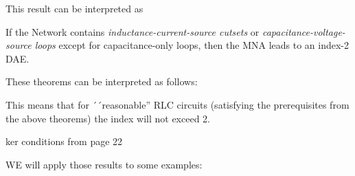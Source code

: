 This result can be interpreted as 

\begin{theorem} \cite{Tischendorf2004Topological}
	If the Network contains \emph{inductance-current-source cutsets} or \emph{capacitance-voltage-source loops} except for capacitance-only loops, then the MNA leads to an index-2 DAE.
\end{theorem}

These theorems can be interpreted as follows:


This means that for ´´reasonable'' RLC circuits (satisfying the prerequisites from the above theorems) the index will not exceed 2.


ker conditions from page 22

WE will apply those results to some examples: